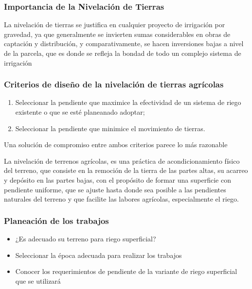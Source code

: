 \subsubsection{Importancia de la Nivelación de Tierras}
La nivelación de tierras se justifica en cualquier proyecto de irrigación por gravedad, ya que generalmente se invierten sumas considerables en obras de captación y distribución, y comparativamente, se hacen inversiones bajas a nivel de la parcela, que es donde se refleja la bondad de todo un complejo sistema de irrigación

\subsubsection{Criterios de diseño de la nivelación de tierras agrícolas}
\begin{enumerate}
    \item Seleccionar la pendiente que maximice la efectividad de un sistema de riego existente o que se esté planeanado adoptar;
    \item Seleccionar la pendiente que minimice el movimiento de tierras.
\end{enumerate}
Una solución de compromiso entre ambos criterios parece lo más razonable

La nivelación de terrenos agrícolas, es una práctica de acondicionamiento físico del terreno, que consiste en la remoción de la tierra de las partes altas, su acarreo y depósito en las partes bajas, con el propósito de formar una superficie con pendiente uniforme, que se ajuste hasta donde sea posible a las pendientes naturales del terreno y que facilite las labores agrícolas, especialmente el riego.

\subsubsection{Planeación de los trabajos}
\begin{itemize}
    \item ¿Es adecuado su terreno para riego superficial?
    \item Seleccionar la época adecuada para realizar los trabajos
    \item Conocer los requerimientos de pendiente de la variante de riego superficial que se utilizará
\end{itemize}
